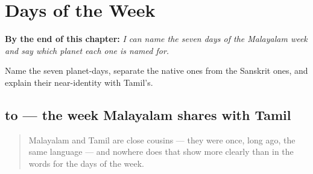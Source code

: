 
\chapter{Days of the Week}
\label{ch:ml-days-of-the-week}

\begin{chapteropening}
\textbf{By the end of this chapter:} \emph{I can name the seven days of the Malayalam week and say which planet each one is named for.}

Name the seven planet-days, separate the native ones from the Sanskrit ones, and explain their near-identity with Tamil's.
\end{chapteropening}

\section[\texorpdfstring{\ml{തിങ്കൾ} \ml{ചൊവ്വ} \ml{ബുധൻ} … (tiṅkaḷ covva …)}{തിങ്കൾ ചൊവ്വ ബുധൻ … (tiṅkaḷ covva …)}]{ to  — the week Malayalam shares with Tamil}

\label{lesson:ML-C10-azhcha}



\begin{quote}
Malayalam and Tamil are close cousins — they were once, long ago, the same language — and nowhere does that show more clearly than in the words for the days of the week.
\end{quote}

